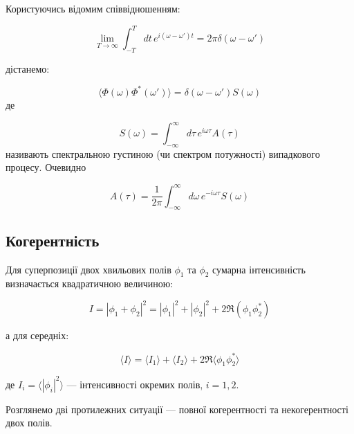Користуючись відомим співвідношенням:

\begin{equation*}
\lim_{T \to \infty} \int_{-T}^{T} dt \, e^{i(\omega - \omega')t} = 2\pi \delta(\omega - \omega')
\end{equation*}

дістанемо:

\begin{equation}
\langle \Phi(\omega) \Phi^{*}(\omega') \rangle = \delta(\omega - \omega') S(\omega)
\label{eq:spectral_density}
\end{equation}
де

\begin{equation*}
S(\omega) = \int_{-\infty}^{\infty} d\tau \, e^{i\omega \tau} A(\tau)
\end{equation*}
називають спектральною густиною (чи спектром потужності) випадкового процесу. Очевидно

\begin{equation*}
A(\tau) = \frac{1}{2\pi} \int_{-\infty}^{\infty} d\omega \, e^{-i\omega \tau} S(\omega)
\end{equation*}

\subsection*{Когерентність}

Для суперпозиції двох хвильових полів \(\phi_1\) та \(\phi_2\) сумарна інтенсивність визначається квадратичною величиною:

\begin{equation*}
I = |\phi_1 + \phi_2|^2 = |\phi_1|^2 + |\phi_2|^2 + 2 \Re(\phi_1 \phi_2^{*})
\end{equation*}

а для середніх:

\begin{equation}
\langle I \rangle = \langle I_1 \rangle + \langle I_2 \rangle + 2 \Re \langle \phi_1 \phi_2^{*} \rangle
\label{eq:intensity}
\end{equation}

де \( I_i = \langle |\phi_i|^2 \rangle \) --- інтенсивності окремих полів, \( i = 1, 2 \).

Розглянемо дві протилежних ситуації --- повної когерентності та некогерентності двох полів.

